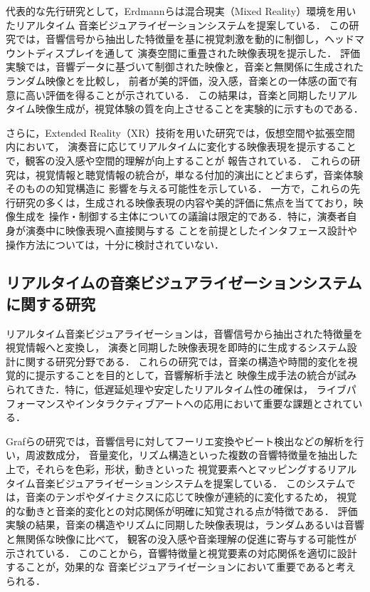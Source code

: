 代表的な先行研究として，Erdmannらは混合現実（Mixed Reality）環境を用いたリアルタイム
音楽ビジュアライゼーションシステムを提案している．
この研究では，音響信号から抽出した特徴量を基に視覚刺激を動的に制御し，ヘッドマウントディスプレイを通して
演奏空間に重畳された映像表現を提示した．
評価実験では，音響データに基づいて制御された映像と，音楽と無関係に生成されたランダム映像とを比較し，
前者が美的評価，没入感，音楽との一体感の面で有意に高い評価を得ることが示されている\cite{erdmann}．
この結果は，音楽と同期したリアルタイム映像生成が，視覚体験の質を向上させることを実験的に示すものである．

さらに，Extended Reality（XR）技術を用いた研究では，仮想空間や拡張空間内において，
演奏音に応じてリアルタイムに変化する映像表現を提示することで，観客の没入感や空間的理解が向上することが
報告されている\cite{CVMusic}．
これらの研究は，視覚情報と聴覚情報の統合が，単なる付加的演出にとどまらず，音楽体験そのものの知覚構造に
影響を与える可能性を示している．
一方で，これらの先行研究の多くは，生成される映像表現の内容や美的評価に焦点を当てており，映像生成を
操作・制御する主体についての議論は限定的である．特に，演奏者自身が演奏中に映像表現へ直接関与する
ことを前提としたインタフェース設計や操作方法については，十分に検討されていない．


\subsection{リアルタイムの音楽ビジュアライゼーションシステムに関する研究}
リアルタイム音楽ビジュアライゼーションは，音響信号から抽出された特徴量を視覚情報へと変換し，
演奏と同期した映像表現を即時的に生成するシステム設計に関する研究分野である．
これらの研究では，音楽の構造や時間的変化を視覚的に提示することを目的として，音響解析手法と
映像生成手法の統合が試みられてきた．特に，低遅延処理や安定したリアルタイム性の確保は，
ライブパフォーマンスやインタラクティブアートへの応用において重要な課題とされている．

Grafらの研究では，音響信号に対してフーリエ変換やビート検出などの解析を行い，周波数成分，
音量変化，リズム構造といった複数の音響特徴量を抽出した上で，それらを色彩，形状，動きといった
視覚要素へとマッピングするリアルタイム音楽ビジュアライゼーションシステムを提案している．
このシステムでは，音楽のテンポやダイナミクスに応じて映像が連続的に変化するため，
視覚的な動きと音楽的変化との対応関係が明確に知覚される点が特徴である．
評価実験の結果，音楽の構造やリズムに同期した映像表現は，ランダムあるいは音響と無関係な映像に比べて，
観客の没入感や音楽理解の促進に寄与する可能性が示されている\cite{graf}．
このことから，音響特徴量と視覚要素の対応関係を適切に設計することが，効果的な
音楽ビジュアライゼーションにおいて重要であると考えられる．

